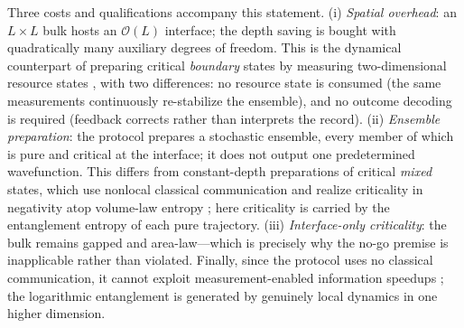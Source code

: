 \documentclass[aps,prl,onecolumn,superscriptaddress,nofootinbib]{revtex4-2}
\begin{document}
Three costs and qualifications accompany this statement.  (i) \emph{Spatial overhead}: an $L\times L$ bulk hosts an $\mathcal{O}(L)$ interface; the depth saving is bought with quadratically many auxiliary degrees of freedom.  This is the dynamical counterpart of preparing critical \emph{boundary} states by measuring two-dimensional resource states \cite{TTVV2024,Zhu2023,LeeJiBiFisher2022,ZhuBoundary2023}, with two differences: no resource state is consumed (the same measurements continuously re-stabilize the ensemble), and no outcome decoding is required (feedback corrects rather than interprets the record).  (ii) \emph{Ensemble preparation}: the protocol prepares a stochastic ensemble, every member of which is pure and critical at the interface; it does not output one predetermined wavefunction.  This differs from constant-depth preparations of critical \emph{mixed} states, which use nonlocal classical communication and realize criticality in negativity atop volume-law entropy \cite{LuZhangVijayHsieh2023,LuMixedFollowup2025}; here criticality is carried by the entanglement entropy of each pure trajectory.  (iii) \emph{Interface-only criticality}: the bulk remains gapped and area-law---which is precisely why the no-go premise is inapplicable rather than violated.  Finally, since the protocol uses no classical communication, it cannot exploit measurement-enabled information speedups \cite{Friedman2022}; the logarithmic entanglement is generated by genuinely local dynamics in one higher dimension.
\end{document}
